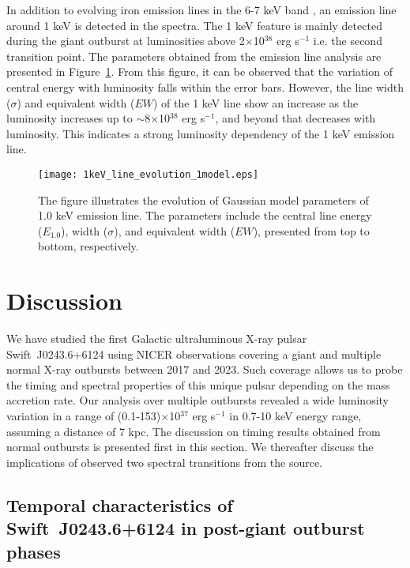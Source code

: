 \documentclass[twocolumn,trackchanges]{aastex631}
\begin{document}
In addition to evolving iron emission lines in the 6-7 keV band \citep{2019ApJ...885...18J}, an emission line around 1 keV is detected in the spectra. The 1 keV feature is mainly detected during the giant outburst at luminosities above 2$\times$10$^{38}$ erg s$^{-1}$ i.e. the second transition point. The parameters obtained from the emission line analysis are presented in Figure~\ref{fig:0p7_1keV_line}. From this figure, it can be observed that the variation of central energy with luminosity falls within the error bars. However,  the line width ($\sigma$) and equivalent width ($EW$) of the 1 keV line show an increase as the luminosity increases up to $\sim$8$\times$10$^{38}$ erg s$^{-1}$, and beyond that decreases with luminosity. This indicates a strong luminosity dependency of the 1 keV emission line.



\begin{figure}
    \centering
    \texttt{[image: 1keV\_line\_evolution\_1model.eps]}
    \caption{The figure illustrates the evolution of Gaussian model parameters of 1.0 keV  emission line. The parameters include the central line energy ($E_{1.0}$), width ($\sigma$), and equivalent width ($EW$), presented from top to bottom, respectively.}
    \label{fig:0p7_1keV_line}
\end{figure}



\section{Discussion}
\label{sec:5}


We have studied the first Galactic ultraluminous X-ray pulsar Swift~J0243.6+6124 using NICER observations covering a giant and multiple normal X-ray outbursts between 2017 and 2023. Such coverage allows us to probe the timing and spectral properties of this unique pulsar depending on the mass accretion rate. Our analysis over multiple outbursts revealed a wide luminosity variation in a range of (0.1-153)$\times$10$^{37}$ erg s$^{-1}$ in 0.7-10 keV energy range, assuming a distance of 7 kpc. The discussion on timing results obtained from normal outbursts is presented first in this section. We thereafter discuss the implications of observed two spectral transitions from the source. 

\subsection{Temporal characteristics of Swift~J0243.6+6124 in post-giant outburst phases}
\end{document}
